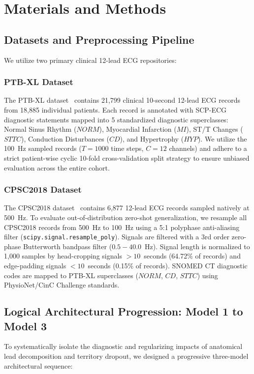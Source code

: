\documentclass[12pt]{elsarticle}
\begin{document}
\section{Materials and Methods}
\label{sec:methods}

\subsection{Datasets and Preprocessing Pipeline}
We utilize two primary clinical 12-lead ECG repositories:

\subsubsection{PTB-XL Dataset}
The PTB-XL dataset~\cite{wagner2020ptb} contains 21,799 clinical 10-second 12-lead ECG records from 18,885 individual patients. Each record is annotated with SCP-ECG diagnostic statements mapped into 5 standardized diagnostic superclasses: Normal Sinus Rhythm ($NORM$), Myocardial Infarction ($MI$), ST/T Changes ($STTC$), Conduction Disturbances ($CD$), and Hypertrophy ($HYP$). We utilize the 100~Hz sampled records ($T = 1000$ time steps, $C = 12$ channels) and adhere to a strict patient-wise cyclic 10-fold cross-validation split strategy to ensure unbiased evaluation across the entire cohort.

\subsubsection{CPSC2018 Dataset}
The CPSC2018 dataset~\cite{liu2018open} contains 6,877 12-lead ECG records sampled natively at 500~Hz. To evaluate out-of-distribution zero-shot generalization, we resample all CPSC2018 records from 500~Hz to 100~Hz using a 5:1 polyphase anti-aliasing filter (\texttt{scipy.signal.resample\_poly}). Signals are filtered with a 3rd order zero-phase Butterworth bandpass filter ($0.5 - 40.0$~Hz). Signal length is normalized to 1,000 samples by head-cropping signals $> 10$~seconds (64.72\% of records) and edge-padding signals $< 10$~seconds (0.15\% of records). SNOMED CT diagnostic codes are mapped to PTB-XL superclasses ($NORM$, $CD$, $STTC$) using PhysioNet/CinC Challenge standards.

\subsection{Logical Architectural Progression: Model 1 to Model 3}
To systematically isolate the diagnostic and regularizing impacts of anatomical lead decomposition and territory dropout, we designed a progressive three-model architectural sequence:
\end{document}
